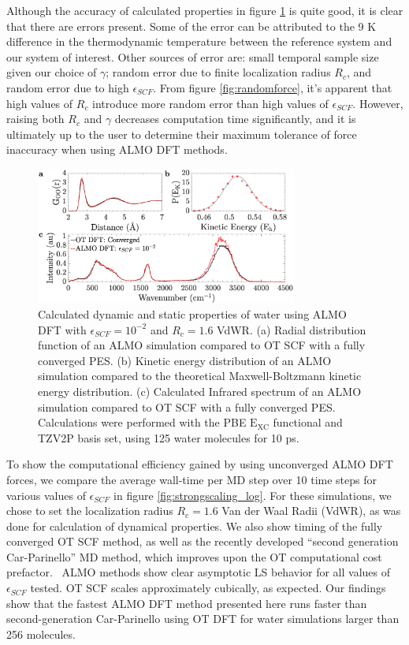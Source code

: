 \documentclass[aps,prl,reprint,amsmath,amssymb]{revtex4-1}
\begin{document}
Although the accuracy of calculated properties in figure \ref{fig:dynproperties} is quite good, it is clear that there are errors present.
Some of the error can be attributed to the 9 K difference in the thermodynamic temperature between the reference system and our system of interest.
Other sources of error are: small temporal sample size given our choice of $\gamma$; random error due to finite localization radius $R_{c}$, and random error due to high $\epsilon_{SCF}$.
From figure \ref{fig:randomforce}, it's apparent that high values of $R_{c}$ introduce more random error than high values of $\epsilon_{SCF}$.
However, raising both $R_{c}$ and $\gamma$ decreases computation time significantly, and it is ultimately up to the user to determine their maximum tolerance of force inaccuracy when using ALMO DFT methods.

\begin{figure}
\includegraphics[trim={1.3cm 0.1cm 3.3cm 1.3cm},clip,width=8.6cm]{Dynamical_Data_Tiled.eps}
\caption{\label{fig:dynproperties} Calculated dynamic and static properties of water using ALMO DFT with $\epsilon_{SCF} = 10^{-2}$ and $R_{c} = 1.6$ VdWR.
(a) Radial distribution function of an ALMO simulation compared to OT SCF with a fully converged PES. 
(b) Kinetic energy distribution of an ALMO simulation compared to the theoretical Maxwell-Boltzmann kinetic energy distribution.
(c) Calculated Infrared spectrum of an ALMO simulation compared to OT SCF with a fully converged PES.
Calculations were performed with the PBE $\mathrm{E_{XC}}$ functional and TZV2P basis set, using 125 water molecules for 10 ps.}
\end{figure}


To show the computational efficiency gained by using unconverged ALMO DFT forces, we compare the average wall-time per MD step over 10 time steps for various values of $\epsilon_{SCF}$ in figure \ref{fig:strongscaling_log}.
For these simulations, we chose to set the localization radius $R_{c} = 1.6$ Van der Waal Radii (VdWR), as was done for calculation of dynamical properties.
We also show timing of the fully converged OT SCF method, as well as the recently developed ``second generation Car-Parinello'' MD method, which improves upon the OT computational cost prefactor.~\cite{a:2ndcpmd}
ALMO methods show clear asymptotic LS behavior for all values of $\epsilon_{SCF}$ tested.
OT SCF scales approximately cubically, as expected.
Our findings show that the fastest ALMO DFT method presented here runs faster than second-generation Car-Parinello using OT DFT for water simulations larger than 256 molecules.
\end{document}
